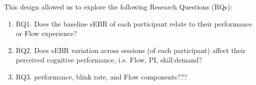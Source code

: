 \documentclass[10pt,letterpaper,floatsintext]{article}
\begin{document}

%
%
%
%


This design allowed us to explore the following Research Questions (RQs):

\begin{enumerate}
	\item RQ1. Does the baseline sEBR of each participant relate to their performance or Flow experience?

	\item RQ2. Does sEBR variation across sessions (of each participant) affect their perceived cognitive performance, i.e. Flow, PI, skill:demand?

	\item RQ3. performance, blink rate, and Flow components???

\end{enumerate}
\end{document}
